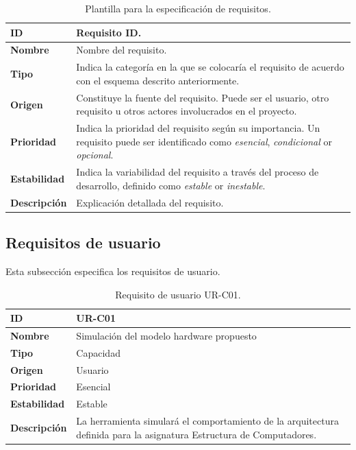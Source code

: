 \begin{center}
\begin{table}[htbp]
\centering
\caption{Plantilla para la especificación de requisitos.}
\begin{tabular}{@{}p{2.5cm} p{9cm}@{}} 
\toprule
\textbf{ID} 				& Requisito ID. \\
\midrule
\textbf{Nombre} 			& Nombre del requisito. \\
\midrule
\textbf{Tipo} 			& Indica la categoría en la que se colocaría el requisito de acuerdo con el esquema descrito anteriormente. \\
\midrule
\textbf{Origen} 			& Constituye la fuente del requisito. Puede ser el usuario, otro requisito u otros actores involucrados en el proyecto. \\
\midrule
\textbf{Prioridad}		& Indica la prioridad del requisito según su importancia. Un requisito puede ser identificado como \textit{esencial}, \textit{condicional} or \textit{opcional}. \\
\midrule
\textbf{Estabilidad} 		& Indica la variabilidad del requisito a través del proceso de desarrollo, definido como \textit{estable} or \textit{inestable}. \\
\midrule
\textbf{Descripción} 	& Explicación detallada del requisito. \\
\bottomrule
\end{tabular}
\label{tab:requirements_template}
\end{table}
\end{center}

\clearpage
\subsection{Requisitos de usuario}
\label{sec:user_requirements}

Esta subsección especifica los requisitos de usuario.

\begin{center}
\begin{table}[htbp]
\centering
\caption{Requisito de usuario UR-C01.}
\begin{tabular}{@{}p{2.5cm} p{9cm}@{}} 
\toprule
\textbf{ID} 				& UR-C01 \\
\midrule
\textbf{Nombre} 			& Simulación del modelo hardware propuesto\\
\midrule
\textbf{Tipo} 			& Capacidad \\
\midrule
\textbf{Origen} 			& Usuario \\
\midrule
\textbf{Prioridad}		& Esencial \\
\midrule
\textbf{Estabilidad} 		& Estable \\
\midrule
\textbf{Descripción} 	& La herramienta simulará el comportamiento de la arquitectura definida para la asignatura Estructura de Computadores. \\
\bottomrule
\end{tabular}
\label{tab:urc01}
\end{table}
\end{center}

